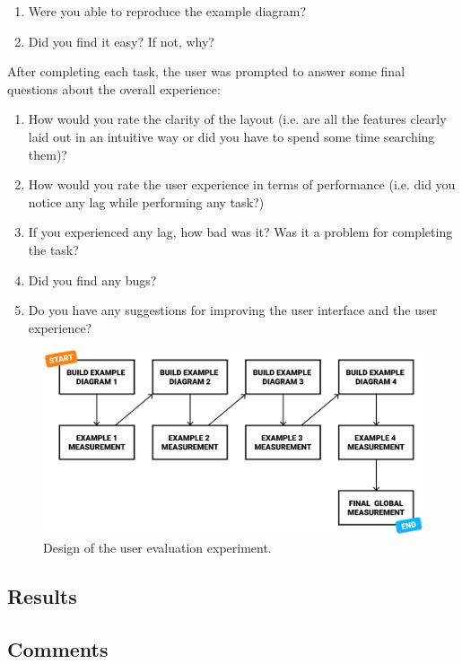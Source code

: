 \documentclass[]{usiinfbachelorproject}
\begin{document}
\begin{enumerate}
	\item Were you able to reproduce the example diagram?
	\item Did you find it easy? If not, why?
\end{enumerate}

\bigskip

\noindent After completing each task, the user was prompted to answer some final questions about the overall experience:

\begin{enumerate}
	\item How would you rate the clarity of the layout (i.e. are all the features clearly laid out in an intuitive way or did you have to spend some time searching them)?
	\item How would you rate the user experience in terms of performance (i.e. did you notice any lag while performing any task?)
	\item If you experienced any lag, how bad was it? Was it a problem for completing the task?
	\item Did you find any bugs?
	\item Do you have any suggestions for improving the user interface and the user experience?
\end{enumerate}


\begin{figure}[h!]
\centering
\includegraphics[scale=.5]{figures/experiment-design.png}
\caption {Design of the user evaluation experiment.}
\label{tree}
\end{figure}

\subsection{Results}

\subsection{Comments}
\end{document}
